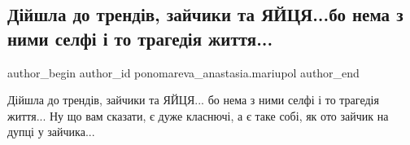  
 
 
 
 

\subsection{Дійшла до трендів, зайчики та ЯЙЦЯ...бо нема з ними селфі і то трагедія життя...}
\label{sec:05_05_2019.fb.ponomareva_anastasia.mariupol.1.dijshla_do_trendiv_zajchyky_ta_jajcja}

\ifcmt
 author_begin
   author_id ponomareva_anastasia.mariupol
 author_end
\fi

Дійшла до трендів,  зайчики та ЯЙЦЯ... бо нема з ними селфі і то трагедія
життя... Ну що вам сказати, є дуже класнючі, а є таке собі, як ото зайчик на
дупці у зайчика...
